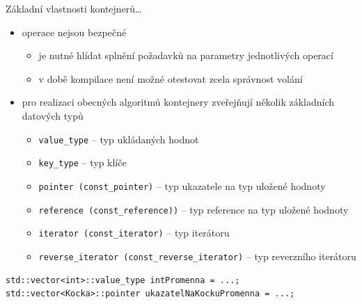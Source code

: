 \begin{frame}[fragile]
\begin{block}{Základní vlastnosti kontejnerů\ldots}
\begin{itemize}
\item operace nejsou bezpečné
\begin{itemize}
\item je nutné hlídat splnění požadavků na parametry jednotlivých operací
\item v době kompilace není možné otestovat zcela správnost volání
\end{itemize}

\item pro realizaci obecných algoritmů kontejnery zveřejňují několik základních datových typů
\begin{itemize}
\item \lstinline|value_type| -- typ ukládaných hodnot
\item \lstinline|key_type| -- typ klíče
\item \lstinline|pointer (const_pointer)| -- typ ukazatele na typ uložené hodnoty
\item \lstinline|reference (const_reference))| -- typ reference na typ uložené hodnoty
\item \lstinline|iterator (const_iterator)| -- typ iterátoru
\item \lstinline|reverse_iterator (const_reverse_iterator)| -- typ reverzního iterátoru
\end{itemize}
\end{itemize}
\end{block}

\begin{yesblock}
\begin{lstlisting}
std::vector<int>::value_type intPromenna = ...;
std::vector<Kocka>::pointer ukazatelNaKockuPromenna = ...;
\end{lstlisting}
\end{yesblock}
\end{frame}







